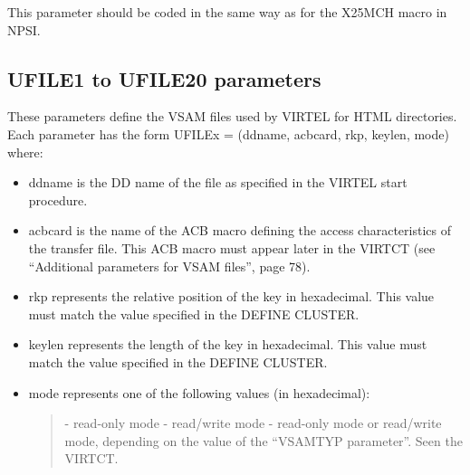 \documentclass[letterpaper,10pt,english]{sphinxmanual}
\begin{document}
This parameter should be coded in the same way as for the X25MCH macro in NPSI.

\ignorespaces 

\subsection{UFILE1 to UFILE20 parameters}
\label{\detokenize{Installation_Guide:ufile1-to-ufile20-parameters}}\label{\detokenize{Installation_Guide:index-133}}
\begin{sphinxVerbatim}[commandchars=\\\{\}]
 
\end{sphinxVerbatim}

These parameters define the VSAM files used by VIRTEL for HTML directories. Each parameter has the form UFILEx = (ddname, acbcard, rkp, keylen, mode) where:
\begin{itemize}
\item {} 
ddname is the DD name of the file as specified in the VIRTEL start procedure.

\item {} 
acbcard is the name of the ACB macro defining the access characteristics of the transfer file. This ACB macro must appear later in the VIRTCT (see “Additional parameters for VSAM files”, page 78).

\item {} 
rkp represents the relative position of the key in hexadecimal. This value must match the value specified in the DEFINE CLUSTER.

\item {} 
keylen represents the length of the key in hexadecimal. This value must match the value specified in the DEFINE CLUSTER.

\item {} 
mode represents one of the following values (in hexadecimal):
\begin{quote}

 - read-only mode
 - read/write mode
 - read-only mode or read/write mode, depending on the value of the “VSAMTYP parameter”. Seen the VIRTCT.
\end{quote}

\end{itemize}
\end{document}
